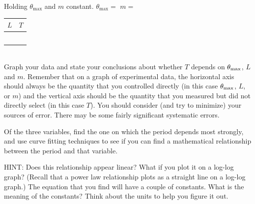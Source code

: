 \documentclass[11pt,letterpaper]{article}
\begin{document}
\vspace{.5cm}

Holding $\theta_{\mathrm{max}}$ and $m$ constant.\hspace{1cm} $\theta_{\mathrm{max}}=$ \hspace{3cm} $m=$

\begin{tabularx}{0.5\linewidth}{|Y|Y|}
\hline
$L$ & $T$ \\
\hline &\\
\hline &\\
\hline &\\
\hline &\\
\hline &\\
\hline
\end{tabularx}\\

Graph your data and state your conclusions about whether $T$ depends on $\theta_{\rm{max}}$, $L$ and $m$.  Remember that on a graph of experimental data, the horizontal axis should always be the quantity that you controlled directly (in this case $\theta_{\rm{max}}$, $L$, or $m$) and the vertical axis should be the quantity that you measured but did not directly select (in this case $T$). You should consider (and try to minimize) your sources of error.  There may be some fairly significant systematic errors.

Of the three variables, find the one on which the period depends most strongly, and use curve fitting techniques to see if you can find a mathematical relationship between the period and that variable. 

HINT: Does this relationship appear linear? What if you plot it on a log-log graph? (Recall that a power law relationship plots as a straight line on a log-log graph.) The equation that you find will have a couple of constants. What is the meaning of the constants? Think about the units to help you figure it out.


\end{document}
